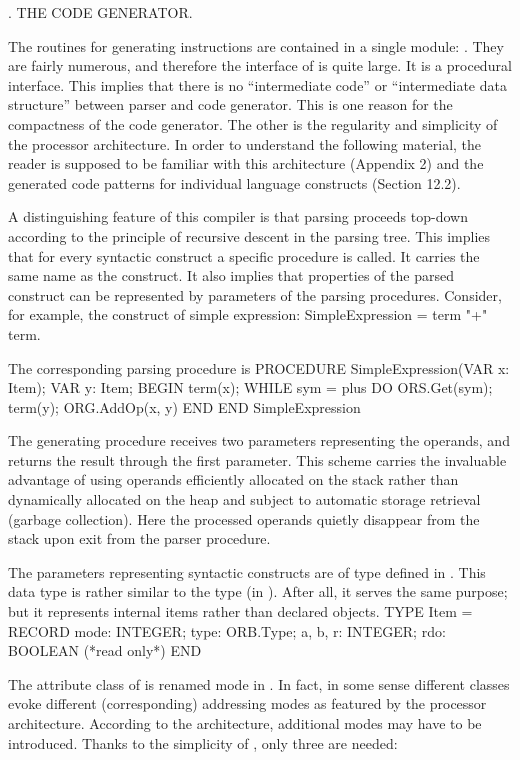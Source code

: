 . THE CODE GENERATOR.

The routines for generating instructions are contained in a single module: . They are fairly numerous, and therefore the interface of  is quite large. It is a procedural interface. This implies that there is no ``intermediate code'' or ``intermediate data structure'' between parser and code generator. This is one reason for the compactness of the code generator. The other is the regularity and simplicity of the processor architecture. In order to understand the following material, the reader is supposed to be familiar with this architecture (Appendix 2) and the generated code patterns for individual language constructs (Section 12.2).

A distinguishing feature of this compiler is that parsing proceeds top-down according to the principle of recursive descent in the parsing tree. This implies that for every syntactic construct a specific procedure is called. It carries the same name as the construct. It also implies that properties of the parsed construct can be represented by parameters of the parsing procedures. Consider, for example, the construct of simple expression:
\begintt
  SimpleExpression = term {"+" term}.
\endtt

\noindent The corresponding parsing procedure is
\begintt
PROCEDURE SimpleExpression(VAR x: Item);
  VAR y: Item;
BEGIN term(x);
  WHILE sym = plus DO ORS.Get(sym); term(y); ORG.AddOp(x, y) END
END SimpleExpression
\endtt

\noindent The generating procedure  receives two parameters representing the operands, and returns the result through the first parameter. This scheme carries the invaluable advantage of using operands efficiently allocated on the stack rather than dynamically allocated on the heap and subject to automatic storage retrieval (garbage collection). Here the processed operands quietly disappear from the stack upon exit from the parser procedure.

The parameters representing syntactic constructs are of type  defined in . This data type is rather similar to the type  (in ). After all, it serves the same purpose; but it represents internal items rather than declared objects.
\begintt
TYPE Item = RECORD
  mode: INTEGER;
  type: ORB.Type;
  a, b, r: INTEGER;
  rdo: BOOLEAN (*read only*)
END
\endtt

\noindent The attribute class of  is renamed mode in . In fact, in some sense different classes evoke different (corresponding) addressing modes as featured by the processor architecture. According to the architecture, additional modes may have to be introduced. Thanks to the simplicity of \RISC, only three are needed:

